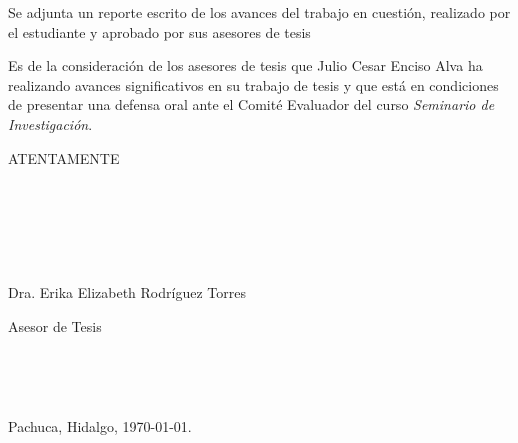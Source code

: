 \documentclass[12pt]{article}
\begin{document}
Se adjunta un reporte escrito de los avances del trabajo en cuesti\'on, realizado por el estudiante
y aprobado por sus asesores de tesis
\medskip

Es de la consideraci\'on de los asesores de tesis que  {\sc Julio Cesar Enciso Alva}
ha realizando avances significativos en su trabajo de tesis y que est\'a en condiciones de presentar una defensa oral
ante el Comit\'e Evaluador del curso {\it Seminario de Investigaci\'on}.
\bigskip


\begin{center}
{\sc ATENTAMENTE}
\end{center}


\

\

\

%
%
%
%
%


\begin{center}

{\sc Dra. Erika Elizabeth Rodr\'iguez Torres}

Asesor de Tesis

 \

 \

Pachuca, Hidalgo, \today.

\end{center}

\vskip 1cm
\end{document}

